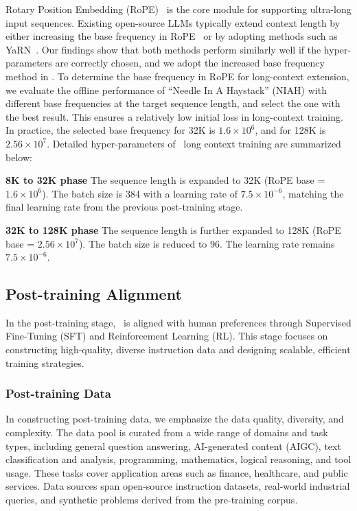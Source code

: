 Rotary Position Embedding (RoPE)~\cite{su2023roformerenhancedtransformerrotary} is the core module for supporting ultra-long input sequences. 
Existing open-source LLMs typically extend context length by either increasing the base frequency in RoPE~\cite{su2023roformerenhancedtransformerrotary,qwen-2.5-coder} or by adopting methods such as YaRN~\cite{peng2023yarnefficientcontextwindow,dubey2024llama,deepseekv3}.
Our findings show that both methods perform similarly well if the hyper-parameters are correctly chosen, and we adopt the increased base frequency method in \modelname.
To determine the base frequency in RoPE for long-context extension, we evaluate the offline performance of ``Needle In A Haystack'' (NIAH) with different base frequencies at the target sequence length, and select the one with the best result.
This ensures a relatively low initial loss in long-context training.
In practice, the selected base frequency for 32K is $1.6\times 10^6$, and for 128K is $2.56\times 10^{7}$.
Detailed hyper-parameters of \modelname~long context training are summarized below:

\textbf{8K to 32K phase} The sequence length is expanded to 32K (RoPE base = $1.6\times 10^6$). The batch size is 384 with a learning rate of $7.5\times 10^{-6}$, matching the final learning rate from the previous post-training stage.

\textbf{32K to 128K phase} The sequence length is further expanded to 128K (RoPE base = $2.56\times 10^{7}$). The batch size is reduced to 96. The learning rate remains $7.5\times 10^{-6}$.



\subsection{Post-training Alignment} 
In the post-training stage, \modelname~is aligned with human preferences through Supervised Fine-Tuning (SFT) and Reinforcement Learning (RL). This stage focuses on constructing high-quality, diverse instruction data and designing scalable, efficient training strategies.


\subsubsection{Post-training Data}
In constructing post-training data, we emphasize the data quality, diversity, and complexity. 
The data pool is curated from a wide range of domains and task types, including general question answering, AI-generated content (AIGC), text classification and analysis, programming, mathematics, logical reasoning, and tool usage.  
These tasks cover application areas such as finance, healthcare, and public services. 
Data sources span open-source instruction datasets, real-world industrial queries, and synthetic problems derived from the pre-training corpus. 

